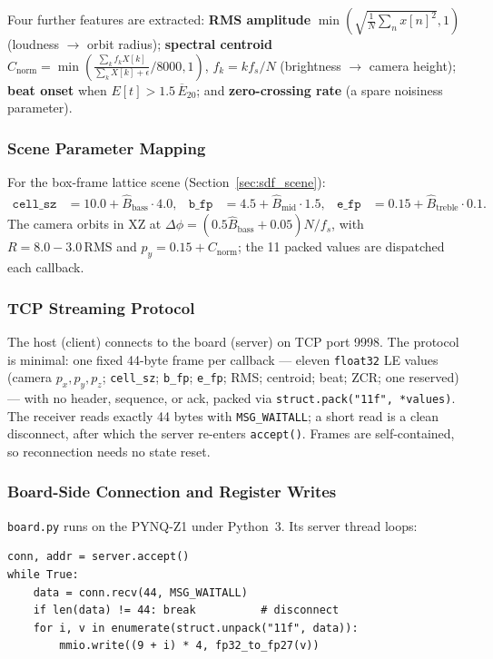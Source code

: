 Four further features are extracted: \textbf{RMS amplitude}
$\min(\sqrt{\frac1N\sum_n x[n]^2},1)$ (loudness $\to$ orbit radius);
\textbf{spectral centroid}
$C_{\mathrm{norm}}=\min(\frac{\sum_k f_k X[k]}{\sum_k X[k]+\epsilon}/8000,1)$,
$f_k=kf_s/N$ (brightness $\to$ camera height); \textbf{beat onset} when
$E[t]>1.5\,\overline{E}_{20}$; and \textbf{zero-crossing rate} (a spare
noisiness parameter).

\subsubsection{Scene Parameter Mapping}
\label{ssec:mapping}

For the box-frame lattice scene (Section~\ref{sec:sdf_scene}):
\begin{align}
\texttt{cell\_sz} &= 10.0 + \hat{B}_{\mathrm{bass}}\cdot4.0, &
\texttt{b\_fp}    &= 4.5  + \hat{B}_{\mathrm{mid}}\cdot1.5, &
\texttt{e\_fp}    &= 0.15 + \hat{B}_{\mathrm{treble}}\cdot0.1.
\end{align}
The camera orbits in XZ at $\Delta\phi=(0.5\hat{B}_{\mathrm{bass}}+0.05)N/f_s$,
with $R=8.0-3.0\,\mathrm{RMS}$ and $p_y=0.15+C_{\mathrm{norm}}$; the 11 packed
values are dispatched each callback.

\subsubsection{TCP Streaming Protocol}
\label{ssec:protocol}

The host (client) connects to the board (server) on TCP port 9998. The protocol
is minimal: one fixed 44-byte frame per callback --- eleven \texttt{float32} LE
values (camera $p_x,p_y,p_z$; \texttt{cell\_sz}; \texttt{b\_fp}; \texttt{e\_fp};
RMS; centroid; beat; ZCR; one reserved) --- with no header, sequence, or ack,
packed via \texttt{struct.pack("11f", *values)}. The receiver reads exactly 44
bytes with \texttt{MSG\_WAITALL}; a short read is a clean disconnect, after which
the server re-enters \texttt{accept()}. Frames are self-contained, so
reconnection needs no state reset.

\subsubsection{Board-Side Connection and Register Writes}
\label{ssec:board}

\texttt{board.py} runs on the PYNQ-Z1 under Python~3. Its server thread loops:
\begin{verbatim}
conn, addr = server.accept()
while True:
    data = conn.recv(44, MSG_WAITALL)
    if len(data) != 44: break          # disconnect
    for i, v in enumerate(struct.unpack("11f", data)):
        mmio.write((9 + i) * 4, fp32_to_fp27(v))
\end{verbatim}

